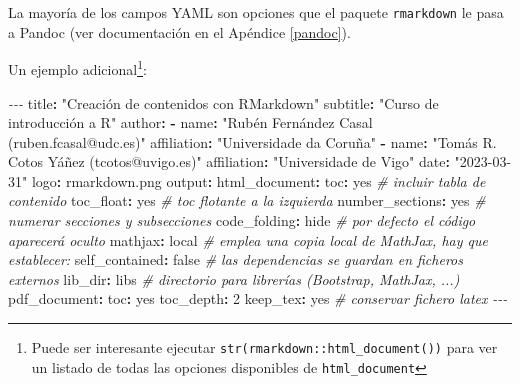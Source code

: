 \documentclass[
]{book}
\newenvironment{Shaded}{\begin{snugshade}}{\end{snugshade}}
\newcommand{\AttributeTok}[1]{\textcolor[rgb]{0.77,0.63,0.00}{#1}}
\newcommand{\CharTok}[1]{\textcolor[rgb]{0.31,0.60,0.02}{#1}}
\newcommand{\CommentTok}[1]{\textcolor[rgb]{0.56,0.35,0.01}{\textit{#1}}}
\newcommand{\DecValTok}[1]{\textcolor[rgb]{0.00,0.00,0.81}{#1}}
\newcommand{\FunctionTok}[1]{\textcolor[rgb]{0.00,0.00,0.00}{#1}}
\newcommand{\KeywordTok}[1]{\textcolor[rgb]{0.13,0.29,0.53}{\textbf{#1}}}
\newcommand{\PreprocessorTok}[1]{\textcolor[rgb]{0.56,0.35,0.01}{\textit{#1}}}
\newcommand{\StringTok}[1]{\textcolor[rgb]{0.31,0.60,0.02}{#1}}
\theoremstyle{break}
\theoremstyle{nonumberplain}
\begin{document}
La mayoría de los campos YAML son opciones que el paquete \texttt{rmarkdown} le pasa a Pandoc
(ver documentación en el Apéndice \ref{pandoc}).

Un ejemplo adicional\footnote{Puede ser interesante ejecutar \texttt{str(rmarkdown::html\_document())}
  para ver un listado de todas las opciones disponibles de \texttt{html\_document}}:

\begin{Shaded}
\begin{Highlighting}[]
\PreprocessorTok{{-}{-}{-}}
\FunctionTok{title}\KeywordTok{:}\AttributeTok{ }\StringTok{"Creación de contenidos con RMarkdown"}
\FunctionTok{subtitle}\KeywordTok{:}\AttributeTok{ }\StringTok{"Curso de introducción a R"}
\FunctionTok{author}\KeywordTok{:}
\KeywordTok{{-}}\AttributeTok{ }\FunctionTok{name}\KeywordTok{:}\AttributeTok{ }\StringTok{"Rubén Fernández Casal (ruben.fcasal@udc.es)"}
\AttributeTok{  }\FunctionTok{affiliation}\KeywordTok{:}\AttributeTok{ }\StringTok{"Universidade da Coruña"}
\KeywordTok{{-}}\AttributeTok{ }\FunctionTok{name}\KeywordTok{:}\AttributeTok{ }\StringTok{"Tomás R. Cotos Yáñez (tcotos@uvigo.es)"}
\AttributeTok{  }\FunctionTok{affiliation}\KeywordTok{:}\AttributeTok{ }\StringTok{"Universidade de Vigo"}
\FunctionTok{date}\KeywordTok{:}\AttributeTok{ }\StringTok{"2023{-}03{-}31"}
\FunctionTok{logo}\KeywordTok{:}\AttributeTok{ rmarkdown.png}
\FunctionTok{output}\KeywordTok{:}
\AttributeTok{  }\FunctionTok{html\_document}\KeywordTok{:}
\AttributeTok{    }\FunctionTok{toc}\KeywordTok{:}\AttributeTok{ }\CharTok{yes}\CommentTok{                  \# incluir tabla de contenido}
\AttributeTok{    }\FunctionTok{toc\_float}\KeywordTok{:}\AttributeTok{ }\CharTok{yes}\CommentTok{            \# toc flotante a la izquierda}
\AttributeTok{    }\FunctionTok{number\_sections}\KeywordTok{:}\AttributeTok{ }\CharTok{yes}\CommentTok{      \# numerar secciones y subsecciones}
\AttributeTok{    }\FunctionTok{code\_folding}\KeywordTok{:}\AttributeTok{ hide}\CommentTok{        \# por defecto el código aparecerá oculto}
\AttributeTok{    }\FunctionTok{mathjax}\KeywordTok{:}\AttributeTok{ local}\CommentTok{            \# emplea una copia local de MathJax, hay que establecer:}
\AttributeTok{    }\FunctionTok{self\_contained}\KeywordTok{:}\AttributeTok{ }\CharTok{false}\CommentTok{     \# las dependencias se guardan en ficheros externos}
\AttributeTok{    }\FunctionTok{lib\_dir}\KeywordTok{:}\AttributeTok{ libs}\CommentTok{             \# directorio para librerías (Bootstrap, MathJax, ...)}
\AttributeTok{  }\FunctionTok{pdf\_document}\KeywordTok{:}
\AttributeTok{    }\FunctionTok{toc}\KeywordTok{:}\AttributeTok{ }\CharTok{yes}
\AttributeTok{    }\FunctionTok{toc\_depth}\KeywordTok{:}\AttributeTok{ }\DecValTok{2}
\AttributeTok{    }\FunctionTok{keep\_tex}\KeywordTok{:}\AttributeTok{ }\CharTok{yes}\CommentTok{             \# conservar fichero latex}
\AttributeTok{    }
\PreprocessorTok{{-}{-}{-}}
\end{Highlighting}
\end{Shaded}
\end{document}

